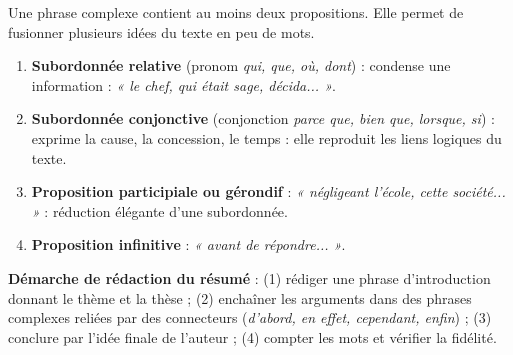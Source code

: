 \documentclass[11pt]{article}
\newcommand{\cle}[1]{{\popxbold\color{popdark}#1}}
\begin{document}
\begin{methode}
Une \cle{phrase complexe} contient au moins deux propositions. Elle permet de fusionner plusieurs idées du texte en peu de mots.
\begin{enumerate}
\item \textbf{Subordonnée relative} (pronom \emph{qui, que, où, dont}) : condense une information : \emph{« le chef, qui était sage, décida... »}.
\item \textbf{Subordonnée conjonctive} (conjonction \emph{parce que, bien que, lorsque, si}) : exprime la cause, la concession, le temps : elle reproduit les liens logiques du texte.
\item \textbf{Proposition participiale ou gérondif} : \emph{« négligeant l'école, cette société... »} : réduction élégante d'une subordonnée.
\item \textbf{Proposition infinitive} : \emph{« avant de répondre... »}.
\end{enumerate}
\textbf{Démarche de rédaction du résumé} : (1) rédiger une phrase d'introduction donnant le thème et la thèse ; (2) enchaîner les arguments dans des phrases complexes reliées par des connecteurs (\emph{d'abord, en effet, cependant, enfin}) ; (3) conclure par l'idée finale de l'auteur ; (4) compter les mots et vérifier la fidélité.
\end{methode}
\end{document}
